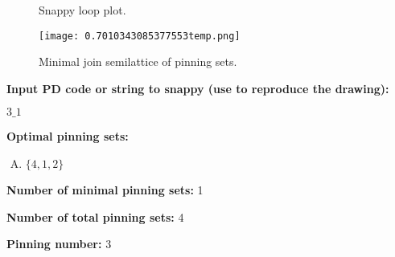\documentclass{article}%
\begin{document}
\begin{multicols}{2}
\begin{figure}[H]
\centering

\caption{Snappy loop plot.}
\label{fig:0.6833919826257141temp.svg}
\end{figure}\columnbreak

\begin{figure}[H]
\centering
\texttt{[image: 0.7010343085377553temp.png]}
\caption{Minimal join semilattice of pinning sets.}
\label{fig:0.7010343085377553temp.png}
\end{figure}\end{multicols}\newpage\begin{multicols}{2}

\columnbreak

\noindent\textbf{Input PD code or string to snappy (use to reproduce the drawing):}

	$3\_1$

\noindent\textbf{Optimal pinning sets:}

\begin{enumerate}[A)]
\item{\Huge\textcolor{green0}{\textbullet}}$\{4,1,2\}$

\end{enumerate}


\noindent\textbf{Number of minimal pinning sets:} 1

\noindent\textbf{Number of total pinning sets:} 4

\noindent\textbf{Pinning number:} 3


\end{multicols}
\end{document}
